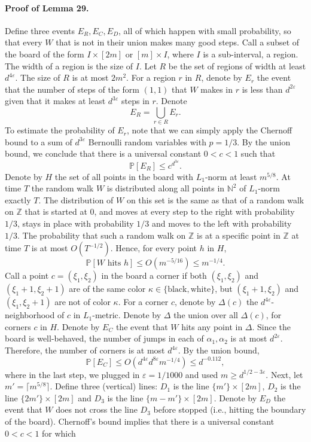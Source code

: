\paragraph{Proof of Lemma 29.} Define three events $E_R,E_C,E_D$, all of which happen with small probability, so that every $W$ that is not in their union makes many good steps.
Call a subset of the board of the form $I\times[2m]$ or $[m]\times I$, where $I$ is a sub-interval, a region. The width of a region is the size of $I$. Let $R$ be the set of regions of width at least $d^{4\varepsilon}$. The size of $R$ is at most $2m^2$. For a region $r$ in $R$, denote by $E_r$ the event that the number of steps of the form $(1,1)$ that $W$ makes in $r$ is less than $d^{2\varepsilon}$ given that it makes at least $d^{3\varepsilon}$ steps in $r$. Denote
\[E_R=\bigcup_{r\in R}E_r.\]
To estimate the probability of $E_r$, note that we can simply apply the Chernoff bound to a sum of $d^{3\varepsilon}$ Bernoulli random variables with $p=1/3$. By the union bound, we conclude that there is a universal constant $0<c<1$ such that
\[\mathbb P[E_R]\leq c^{d^{3\varepsilon}}.\]
Denote by $H$ the set of all points in the board with $L_1$-norm at least $m^{5/8}$. At time $T$ the random walk $W$ is distributed along all points in $\mathbb N^2$ of $L_1$-norm exactly $T$. The distribution of $W$ on this set is the same as that of a random walk on $\mathbb Z$ that is started at $0$, and moves at every step to the right with probability $1/3$, stays in place with probability $1/3$ and moves to the left with probability $1/3$. The probability that such a random walk on $\mathbb Z$ is at a specific point in $\mathbb Z$ at time $T$ is at most $O(T^{-1/2})$. Hence, for every point $h$ in $H$,
\[\mathbb P[W\text{ hits }h]\leq O(m^{-5/16})\leq m^{-1/4}.\]
Call a point $c=(\xi_1,\xi_2)$ in the board a corner if both $(\xi_1,\xi_2)$ and $(\xi_1+1,\xi_2+1)$ are of the same color $\kappa\in\{\text{black},\text{white}\}$, but $(\xi_1+1,\xi_2)$ and $(\xi_1,\xi_2+1)$ are not of color $\kappa$. For a corner $c$, denote by $\Delta(c)$ the $d^{4\varepsilon}$-neighborhood of $c$ in $L_1$-metric. Denote by $\Delta$ the union over all $\Delta(c)$, for corners $c$ in $H$. Denote by $E_C$ the event that $W$ hits any point in $\Delta$. Since the board is well-behaved, the number of jumps in each of $\alpha_1,\alpha_2$ is at most $d^{2\varepsilon}$. Therefore, the number of corners is at most $d^{4\varepsilon}$. By the union bound,
\[\mathbb P[E_C]\leq O(d^{4\varepsilon}d^{8\varepsilon}m^{-1/4})\leq d^{-0.112},\]
where in the last step, we plugged in $\varepsilon=1/1000$ and used $m\geq d^{1/2-3\varepsilon}$. Next, let $m'=\lceil m^{5/8}\rceil$. Define three (vertical) lines: $D_1$ is the line $\{m'\}\times[2m]$, $D_2$ is the line $\{2m'\}\times[2m]$ and $D_3$ is the line $\{m-m'\}\times[2m]$. Denote by $E_D$ the event that $W$ does not cross the line $D_3$ before stopped (i.e., hitting the boundary of the board). Chernoff's bound implies that there is a universal constant $0<c<1$ for which
